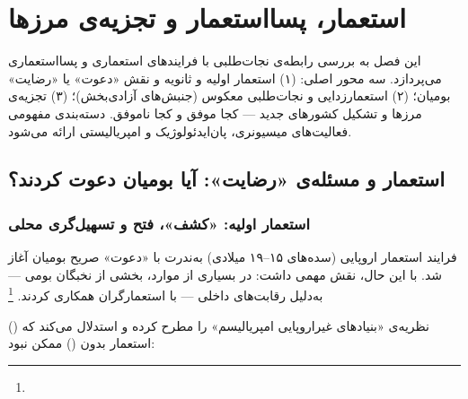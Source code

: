 \chapter{استعمار، پسااستعمار و تجزیه‌ی مرزها}
\label{ch:colonial}

\begin{tcolorbox}[mybox, title={چکیده‌ی فصل}]
این فصل به بررسی رابطه‌ی نجات‌طلبی با فرایندهای استعماری و پسااستعماری می‌پردازد. سه محور اصلی: (۱) استعمار اولیه و ثانویه و نقش «دعوت» یا «رضایت» بومیان؛ (۲) استعمارزدایی و نجات‌طلبی معکوس (جنبش‌های آزادی‌بخش)؛ (۳) تجزیه‌ی مرزها و تشکیل کشورهای جدید — کجا موفق و کجا ناموفق. دسته‌بندی مفهومی فعالیت‌های میسیونری، پان‌ایدئولوژیک و امپریالیستی ارائه می‌شود.
\end{tcolorbox}

\section{استعمار و مسئله‌ی «رضایت»: آیا بومیان دعوت کردند؟}
\label{sec:ch09-colonial-consent}

\subsection{استعمار اولیه: «کشف»، فتح و تسهیل‌گری محلی}
\label{subsec:ch09-early-colonialism}

فرایند استعمار اروپایی (سده‌های ۱۵–۱۹ میلادی) به‌ندرت با «دعوت» صریح بومیان آغاز شد. با این حال،  نقش مهمی داشت: در بسیاری از موارد، بخشی از نخبگان بومی — به‌دلیل رقابت‌های داخلی — با استعمارگران همکاری کردند.%
\footnote{}

 () نظریه‌ی «بنیادهای غیراروپایی امپریالیسم» را مطرح کرده و استدلال می‌کند که استعمار بدون  () ممکن نبود:

